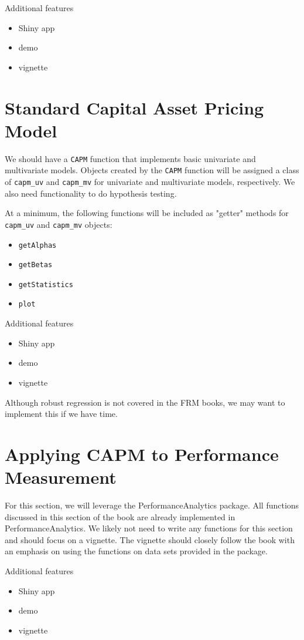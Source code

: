 \documentclass[12pt]{amsart}
\begin{document}
Additional features
\begin{itemize}
\item Shiny app
\item demo
\item vignette
\end{itemize}

\section{Standard Capital Asset Pricing Model}
We should have a \verb"CAPM" function that implements basic univariate and multivariate models. Objects created by the \verb"CAPM" function will be assigned a class of \verb"capm_uv" and \verb"capm_mv" for univariate and multivariate models, respectively. We also need functionality to do hypothesis testing.

At a minimum, the following functions will be included as "getter" methods for \verb"capm_uv" and \verb"capm_mv" objects:
\begin{itemize}
\item \verb"getAlphas"
\item \verb"getBetas"
\item \verb"getStatistics"
\item \verb"plot"
\end{itemize}

Additional features
\begin{itemize}
\item Shiny app
\item demo
\item vignette
\end{itemize}

Although robust regression is not covered in the FRM books, we may want to implement this if we have time.

\section{Applying CAPM to Performance Measurement}
For this section, we will leverage the PerformanceAnalytics package. All functions discussed in this section of the book are already implemented in PerformanceAnalytics. We likely not need to write any functions for this section and should focus on a vignette. The vignette should closely follow the book with an emphasis on using the functions on data sets provided in the package.

Additional features
\begin{itemize}
\item Shiny app
\item demo
\item vignette
\end{itemize}
\end{document}
